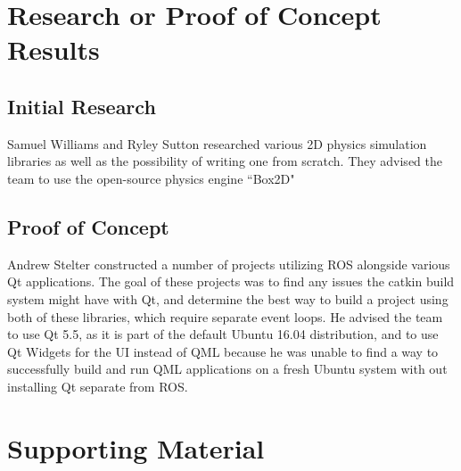 \section{Research or Proof of Concept Results}
\subsection{Initial Research}
Samuel Williams and Ryley Sutton researched various 2D physics simulation libraries as well as the possibility of writing one from scratch. They advised the team to use the open-source physics engine ``Box2D"

\subsection{Proof of Concept}
Andrew Stelter constructed a number of projects utilizing ROS alongside various Qt applications. The goal of these projects was to find any issues the catkin build system might have with Qt, and determine the best way to build a project using both of these libraries, which require separate event loops. He advised the team to use Qt 5.5, as it is part of the default Ubuntu 16.04 distribution, and to use Qt Widgets for the UI instead of QML because he was unable to find a way to successfully build and run QML applications on a fresh Ubuntu system with out installing Qt separate from ROS.

\section{Supporting Material}

